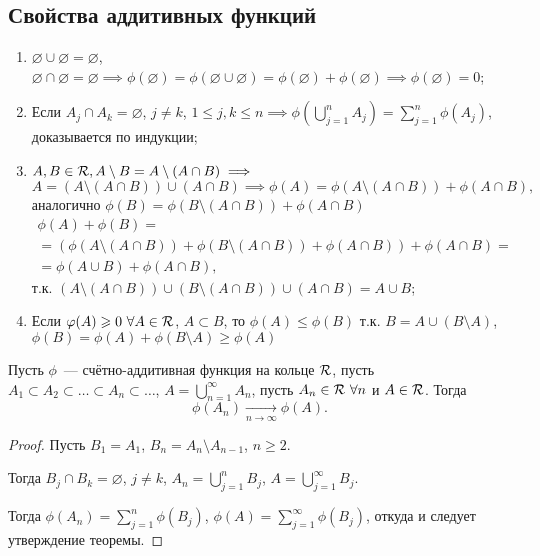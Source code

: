 \documentclass[main]{subfiles}
\begin{document}
\subsection{Свойства аддитивных функций}
\begin{enumerate}
    \item $\varnothing \cup \varnothing = \varnothing$, $\varnothing \cap \varnothing = \varnothing \implies \phi(\varnothing) = \phi(\varnothing \cup \varnothing) = \phi(\varnothing) + \phi(\varnothing) \implies \phi(\varnothing) = 0$;
    \item Если $A_j \cap A_k = \varnothing$, $j \neq k$, $1\le j, k\le n \implies \phi(\bigcup_{j=1}^{n} A_j) = \sum_{j=1}^n \phi(A_j)$, доказывается по индукции;
    \item $A, B \in \mathcal{R}, A \setminus B = A \setminus (A \cap B) \implies$
          \[A = (A \setminus (A \cap B)) \cup (A \cap B) \implies \phi(A) = \phi(A \setminus (A \cap B)) + \phi(A \cap B),\]
          аналогично $\phi(B) = \phi(B \setminus (A \cap B)) + \phi(A \cap B)$
          \begin{multline*}
              \phi(A) + \phi(B) = \\
              = (\phi(A \setminus (A \cap B)) + \phi(B \setminus (A \cap B)) + \phi(A \cap B)) + \phi(A \cap B) = \\
              = \phi(A \cup B) + \phi(A \cap B),
          \end{multline*}
          т.к. $(A \setminus (A \cap B)) \cup (B \setminus (A \cap B)) \cup (A \cap B) = A \cup B$;
    \item Если $\varphi(A) \geqslant 0\ \forall A \in \mathcal{R}$, $A \subset B$, то $\phi(A) \le \phi(B)$ т.к. $B = A \cup (B \setminus A)$, $\phi(B) = \phi(A) + \phi(B \setminus A) \ge \phi(A)$
\end{enumerate}

\begin{theorem}
    Пусть $\phi$~--- счётно-аддитивная функция на кольце $\mathcal{R}$, пусть $A_1 \subset A_2 \subset \dots \subset A_n \subset \dots$, $A = \bigcup_{n=1}^{\infty} A_n$, пусть $A_n\in\mathcal{R}\ \forall n$ и $A\in\mathcal{R}$.
    Тогда
    \[\phi(A_n)\xrightarrow[n\to\infty]{} \phi(A).\]
\end{theorem}

\begin{proof}
    Пусть $B_1=A_1$, $B_n=A_n\setminus A_{n-1}$, $n\ge 2$.

    Тогда $B_j\cap B_k=\varnothing$, $j\neq k$, $A_n = \bigcup_{j=1}^n B_j$, $A = \bigcup_{j=1}^\infty B_j$.

    Тогда $\phi(A_n)=\sum_{j=1}^n \phi(B_j)$, $\phi(A)=\sum_{j=1}^{\infty}\phi(B_j)$, откуда и следует утверждение теоремы.
\end{proof}
\end{document}
